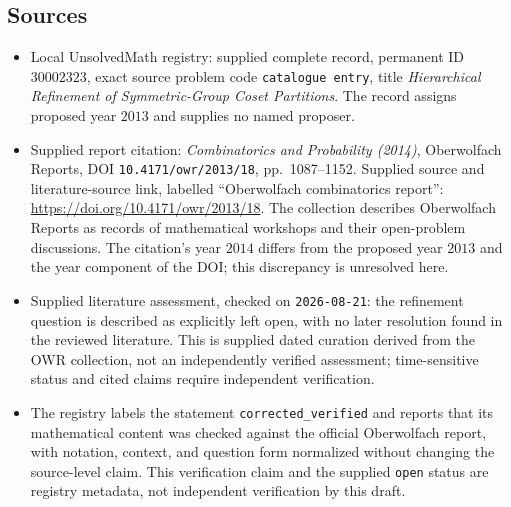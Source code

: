 \documentclass[11pt]{article}
\begin{document}
\subsection{Sources}
\begin{itemize}
\item Local UnsolvedMath registry: supplied complete record, permanent ID \(30002323\), exact source problem code \texttt{catalogue entry}, title \emph{Hierarchical Refinement of Symmetric-Group Coset Partitions}. The record assigns proposed year \(2013\) and supplies no named proposer.
\item Supplied report citation: \emph{Combinatorics and Probability (2014)}, Oberwolfach Reports, DOI \texttt{10.4171/owr/2013/18}, pp.\ 1087--1152. Supplied source and literature-source link, labelled ``Oberwolfach combinatorics report'': \url{https://doi.org/10.4171/owr/2013/18}. The collection describes Oberwolfach Reports as records of mathematical workshops and their open-problem discussions. The citation's year \(2014\) differs from the proposed year \(2013\) and the year component of the DOI; this discrepancy is unresolved here.
\item Supplied literature assessment, checked on \texttt{2026-08-21}: the refinement question is described as explicitly left open, with no later resolution found in the reviewed literature. This is supplied dated curation derived from the OWR collection, not an independently verified assessment; time-sensitive status and cited claims require independent verification.
\item The registry labels the statement \texttt{corrected\_verified} and reports that its mathematical content was checked against the official Oberwolfach report, with notation, context, and question form normalized without changing the source-level claim. This verification claim and the supplied \texttt{open} status are registry metadata, not independent verification by this draft.
\end{itemize}
\end{document}
